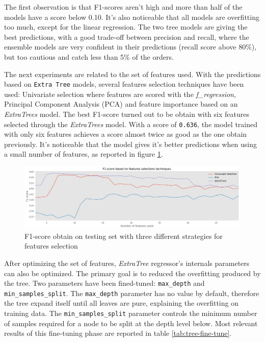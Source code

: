 The first observation is that F1-scores aren't high and more than half of the models have a score below 0.10. It's also noticeable that all models are overfitting too much, except for the linear regression. The two tree models are giving the best predictions, with a good trade-off between precision and recall, where the ensemble models are very confident in their predictions (recall score above 80\%), but too cautious and catch less than 5\% of the orders.

The next experiments are related to the set of features used. With the predictions based on \texttt{Extra Tree} models, several features selection techniques have been used: Univariate selection where features are scored with the \textit{f\_regression}, Principal Component Analysis (PCA) and feature importance based on an \textit{ExtraTrees} model. The best F1-score turned out to be obtain with six features selected through the \textit{ExtraTrees} model. With a score of \texttt{0.636}, the model trained with only six features achieves a score almost twice as good as the one obtain previously. It's noticeable that the model gives it's better predictions when using a small number of features, as reported in figure \ref{fig:feature-selection}.

\begin{figure}[!htbp]
    \centering
    \includegraphics[width=15cm]{images/feature_selection.png}
    \caption[F1-score based on feature selection]{F1-score obtain on testing set with three different strategies for features selection}
    \label{fig:feature-selection}
\end{figure}

After optimizing the set of features, \textit{ExtraTree} regressor's internals parameters can also be optimized. The primary goal is to reduced the overfitting produced by the tree. Two parameters have been fined-tuned: \texttt{max\_depth} and \texttt{min\_samples\_split}. The \texttt{max\_depth} parameter has no value by default, therefore the tree expand itself until all leaves are pure, explaining the overfitting on training data. The \texttt{min\_samples\_split} parameter controls the minimum number of samples required for a node to be split at the depth level below. Most relevant results of this fine-tuning phase are reported in table \ref{tab:tree-fine-tune}.

